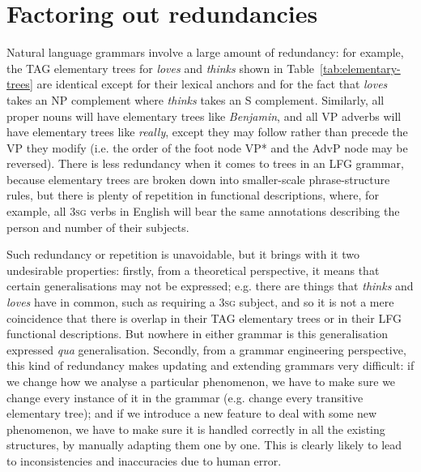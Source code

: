 \documentclass[output=paper,hidelinks]{langscibook}
\begin{document}

\section{Factoring out redundancies}
\label{sec:TAG:metagrammars}


Natural language grammars involve a large amount of redundancy: for example, the
TAG elementary trees for \textit{loves} and \textit{thinks} shown in
Table~\ref{tab:elementary-trees} are identical except for their lexical anchors
and for the fact that \textit{loves} takes an NP complement where
\textit{thinks} takes an S complement. Similarly, all proper nouns will have
elementary trees like \textit{Benjamin}, and all VP adverbs will have elementary
trees like \textit{really}, except they may follow rather than precede the VP
they modify (i.e. the order of the foot node VP* and the AdvP node may be
reversed). There is less redundancy when it comes to trees in an LFG grammar,
because elementary trees are broken down into smaller-scale phrase-structure
rules, but there is plenty of repetition in functional descriptions, where, for
example, all \textsc{3sg} verbs in English will bear the same annotations
describing the person and number of their subjects.

Such redundancy or repetition is unavoidable, but it brings with it two
undesirable properties: firstly, from a theoretical perspective, it means that
certain generalisations may not be expressed; e.g. there are things that
\textit{thinks} and \textit{loves} have in common, such as requiring a \textsc{3sg}
subject, and so it is not a mere coincidence that there is overlap in their TAG
elementary trees or in their LFG functional descriptions. But nowhere in either
grammar is this generalisation expressed \textit{qua} generalisation. Secondly,
from a grammar engineering perspective, this kind of redundancy makes updating
and extending grammars very difficult: if we change how we analyse a particular
phenomenon, we have to make sure we change every instance of it in the grammar
(e.g. change every transitive elementary tree); and if we introduce a new
feature to deal with some new phenomenon, we have to make sure it is handled
correctly in all the existing structures, by manually adapting them one by one.
This is clearly likely to lead to inconsistencies and inaccuracies due to human
error.
\end{document}
